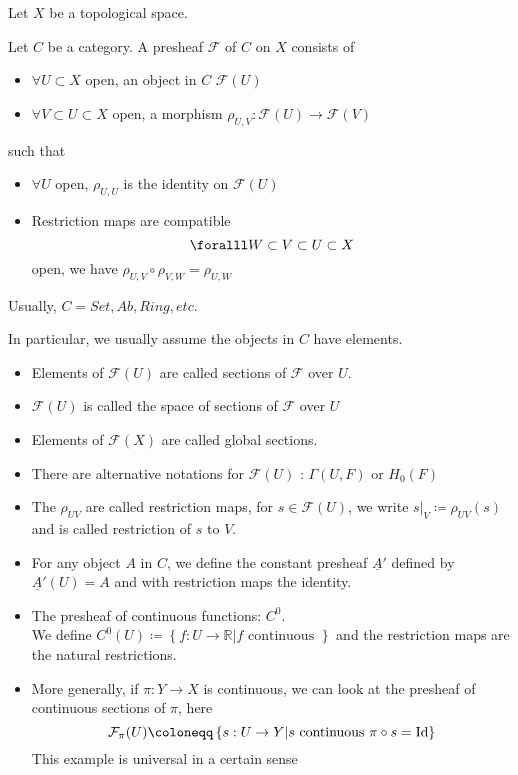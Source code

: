\documentclass[../main.tex]{subfiles}
\begin{document}
Let $X$ be a topological space.
\begin{defn}[Presheaf]
	Let $C$ be a category. A presheaf $\mathcal{F}$ of $C$ on $X$ consists of 
	\begin{itemize}
	\item $\forall U \subset X$ open, an object in $C$ $\mathcal{F}( U) $ 
	\item $\forall V \subset U \subset X$ open, a morphism $\rho_{U,V} : \mathcal{F}( U) \to \mathcal{F}( V) $ 
	\end{itemize}
	such that 
	\begin{itemize}
	\item $\forall U$ open, $\rho_{U,U} $ is the identity on $\mathcal{F}( U) $ 
	\item Restriction maps are compatible
		\[ 
			\foralll W \subset V \subset U \subset X
		\]
		open, we have $\rho_{U,V} \circ \rho_{V,W} = \rho_{U,W} $ 
	\end{itemize}
	
\end{defn}
\begin{rmq}
Usually, $C = Set, Ab, Ring, etc.$ 
\end{rmq}
In particular, we usually assume the objects in $C$ have elements.
\begin{rmq}
\begin{itemize}
\item Elements of $\mathcal{F}( U) $ are called sections of $\mathcal{F}$ over $U$.
\item $\mathcal{F}( U) $ is called the space of sections of $\mathcal{F}$ over $U$ 
\item Elements of $\mathcal{F}( X) $ are called global sections.
\item There are alternative notations for $\mathcal{F}( U) $ : $ \Gamma( U,F) $ or $H_0( F) $ 
\item The $\rho_{UV} $ are called restriction maps, for $s\in \mathcal{F}( U) $, we write $s|_V \coloneqq  \rho_{UV} ( s) $ and is called restriction of $s$ to $V$.
\end{itemize}
\end{rmq}
\begin{exemple}
\begin{itemize}
	\item For any object $A$ in $C$, we define the constant presheaf $ \underline{A}'$ defined by $\underline{A}'( U) = A $ and with restriction maps the identity.
	\item The presheaf of continuous functions: $C^{0}$.\\
		We define $C^{0}( U) \coloneqq \left\{ f:U\to \mathbb{R}| f \text{ continuous }  \right\} $ and the restriction maps are the natural restrictions.
	\item More generally, if $\pi:Y\to X$ is continuous, we can look at the presheaf of continuous sections of $\pi$, here
		\[ 
		\mathcal{F}_\pi( U) \coloneqq  \left\{ s:U \to Y | s \text{ continuous } \pi \circ s = \id \right\} 
		\]
		This example is universal in a certain sense
\end{itemize}
\end{exemple}
\end{document}
